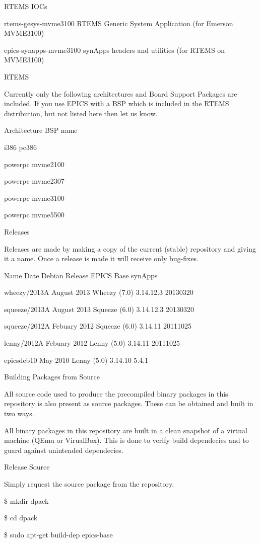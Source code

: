 \documentclass[letterpaper,10pt,english]{sphinxmanual}
\begin{document}
RTEMS IOCs

rtems-gesys-mvme3100    RTEMS Generic System Application (for Emerson MVME3100)

epics-synapps-mvme3100  synApps headers and utilities (for RTEMS on MVME3100)

RTEMS

Currently only the following architectures and Board Support Packages are included. If you use EPICS with a BSP which is included in the RTEMS distribution, but not listed here then let us know.

Architecture    BSP name

i386    pc386

powerpc mvme2100

powerpc mvme2307

powerpc mvme3100

powerpc mvme5500

Releases

Releases are made by making a copy of the current (stable) repository and giving it a name. Once a release is made it will receive only bug-fixes.

Name    Date    Debian Release  EPICS Base      synApps

wheezy/2013A    August 2013     Wheezy (7.0)    3.14.12.3       20130320

squeeze/2013A   August 2013     Squeeze (6.0)   3.14.12.3       20130320

squeeze/2012A   Febuary 2012    Squeeze (6.0)   3.14.11 20111025

lenny/2012A     Febuary 2012    Lenny (5.0)     3.14.11 20111025

epicsdeb10      May 2010        Lenny (5.0)     3.14.10 5.4.1

Building Packages from Source

All source code used to produce the precompiled binary packages in this repository is also present as source packages. These can be obtained and built in two ways.

All binary packages in this repository are built in a clean snapshot of a virtual machine (QEmu or VirualBox). This is done to verify build dependecies and to guard against unintended dependecies.

Release Source

Simply request the source package from the repository.

\$ mkdir dpack

\$ cd dpack

\$ sudo apt-get build-dep epics-base
\end{document}
